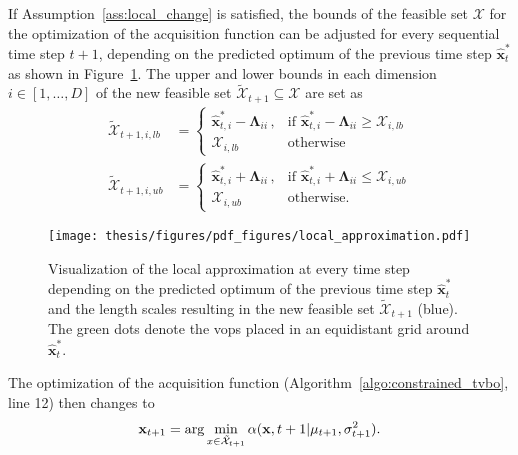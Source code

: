 If Assumption~\ref{ass:local_change} is satisfied, the bounds of the feasible set $\mathcal{X}$ for the optimization of the acquisition function can be adjusted for every sequential time step $t+1$, depending on the predicted optimum of the previous time step $\hat{\mathbf{x}}^*_{t}$ as shown in Figure~\ref{fig:local_approximation}. The upper and lower bounds in each dimension $i\in[1,\dots,D]$ of the new feasible set $\tilde{\mathcal{X}}_{t+1} \subseteq \mathcal{X}$ are set as
\begin{align}
    \tilde{\mathcal{X}}_{t+1,i,lb} &= 
        \begin{cases}
            \hat{\mathbf{x}}^*_{t,i} - \boldsymbol\Lambda_{ii}\, ,& \text{if } \hat{\mathbf{x}}^*_{t,i} - \boldsymbol\Lambda_{ii} \geq \mathcal{X}_{i,lb}\\
            \mathcal{X}_{i,lb}\,&\text{otherwise}
        \end{cases} \\
    \tilde{\mathcal{X}}_{t+1,i,ub} &= 
        \begin{cases}
            \hat{\mathbf{x}}^*_{t,i} + \boldsymbol\Lambda_{ii}\, ,& \text{if } \hat{\mathbf{x}}^*_{t,i} + \boldsymbol\Lambda_{ii} \leq \mathcal{X}_{i,ub}\\
            \mathcal{X}_{i,ub}\, &\text{otherwise.}
        \end{cases}
\end{align}
\begin{figure}[h]
   \centering
   \texttt{[image: thesis/figures/pdf\_figures/local\_approximation.pdf]}
 \caption[Visualization of the local approximation.]{Visualization of the local approximation at every time step depending on the predicted optimum of the previous time step $\hat{\mathbf{x}}^*_{t}$ and the length scales resulting in the new feasible set $\tilde{\mathcal{X}}_{t+1}$ (blue). The green dots denote the \glspl{vop} placed in an equidistant grid around $\hat{\mathbf{x}}^*_{t}$.}
 \label{fig:local_approximation}
\end{figure}

The optimization of the acquisition function (Algorithm~\ref{algo:constrained_tvbo}, line 12) then changes to
\begin{equation}
    \mathbf{x}_{t+1} = \arg\min_{x\in \tilde{\mathcal{X}}_{t+1}} \alpha(\mathbf{x}, t+1|\mu_{t+1}, \sigma^2_{t+1}).
\end{equation}

